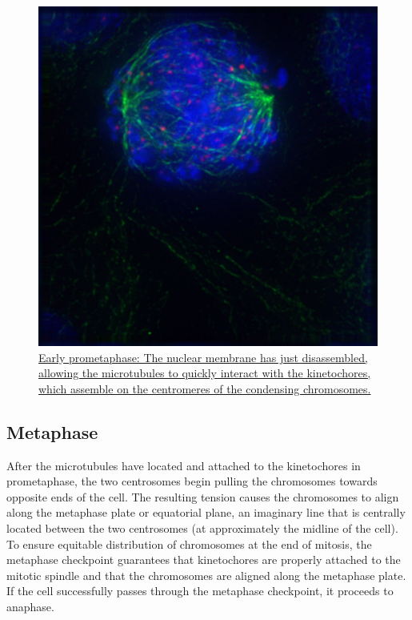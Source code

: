 \begin{figure}

{\centering \includegraphics[width=0.7\linewidth]{./figures/reproduction/Prometaphase} 

}

\caption{\href{https://commons.wikimedia.org/wiki/File:Prometaphase.jpg}{Early prometaphase: The nuclear membrane has just disassembled, allowing the microtubules to quickly interact with the kinetochores, which assemble on the centromeres of the condensing chromosomes.}}\label{fig:prometaphase}
\end{figure}

\hypertarget{metaphase}{%
\subsection{Metaphase}\label{metaphase}}

After the microtubules have located and attached to the kinetochores in prometaphase, the two centrosomes begin pulling the chromosomes towards opposite ends of the cell. The resulting tension causes the chromosomes to align along the metaphase plate or equatorial plane, an imaginary line that is centrally located between the two centrosomes (at approximately the midline of the cell). To ensure equitable distribution of chromosomes at the end of mitosis, the metaphase checkpoint guarantees that kinetochores are properly attached to the mitotic spindle and that the chromosomes are aligned along the metaphase plate. If the cell successfully passes through the metaphase checkpoint, it proceeds to anaphase.



